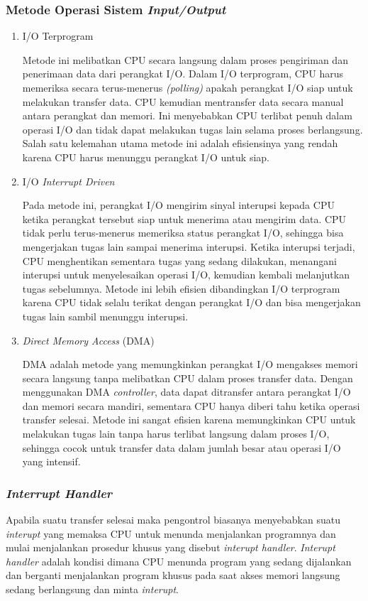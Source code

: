 \documentclass[12pt]{article}
\begin{document}
\subsubsection{Metode Operasi Sistem \textit{Input/Output}}
\begin{enumerate}
    \item I/O Terprogram \par
    Metode ini melibatkan CPU secara langsung dalam proses pengiriman dan penerimaan data dari perangkat I/O. Dalam I/O terprogram, CPU harus memeriksa secara terus-menerus \textit{(polling)} apakah perangkat I/O siap untuk melakukan transfer data. CPU kemudian mentransfer data secara manual antara perangkat dan memori. Ini menyebabkan CPU terlibat penuh dalam operasi I/O dan tidak dapat melakukan tugas lain selama proses berlangsung. Salah satu kelemahan utama metode ini adalah efisiensinya yang rendah karena CPU harus menunggu perangkat I/O untuk siap.
    \item I/O \emph{Interrupt Driven} \par
    Pada metode ini, perangkat I/O mengirim sinyal interupsi kepada CPU ketika perangkat tersebut siap untuk menerima atau mengirim data. CPU tidak perlu terus-menerus memeriksa status perangkat I/O, sehingga bisa mengerjakan tugas lain sampai menerima interupsi. Ketika interupsi terjadi, CPU menghentikan sementara tugas yang sedang dilakukan, menangani interupsi untuk menyelesaikan operasi I/O, kemudian kembali melanjutkan tugas sebelumnya. Metode ini lebih efisien dibandingkan I/O terprogram karena CPU tidak selalu terikat dengan perangkat I/O dan bisa mengerjakan tugas lain sambil menunggu interupsi.
    \item \emph{Direct Memory Access} (DMA) \par
    DMA adalah metode yang memungkinkan perangkat I/O mengakses memori secara langsung tanpa melibatkan CPU dalam proses transfer data. Dengan menggunakan DMA \emph{controller}, data dapat ditransfer antara perangkat I/O dan memori secara mandiri, sementara CPU hanya diberi tahu ketika operasi transfer selesai. Metode ini sangat efisien karena memungkinkan CPU untuk melakukan tugas lain tanpa harus terlibat langsung dalam proses I/O, sehingga cocok untuk transfer data dalam jumlah besar atau operasi I/O yang intensif.
\end{enumerate}

\subsubsection{\emph{Interrupt Handler}}
Apabila suatu transfer selesai maka pengontrol biasanya menyebabkan suatu \textit{interupt} yang memaksa CPU untuk menunda menjalankan programnya dan mulai menjalankan prosedur khusus yang disebut \emph{interupt handler}. \emph{Interupt handler} adalah kondisi dimana CPU menunda program yang sedang dijalankan dan berganti menjalankan program khusus pada saat akses memori langsung sedang berlangsung dan minta \emph{interupt}.
\end{document}
